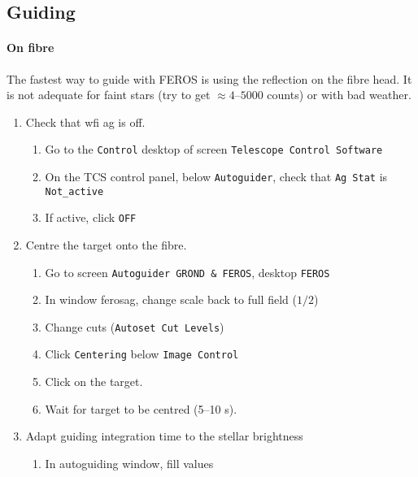 \documentclass[11pt,fleqn,a4paper]{book}
\begin{document}
\newpage

\subsection{Guiding}
\label{sec:ferosguiding}

\paragraph{On fibre}

The fastest way to guide with FEROS is using the reflection on the fibre head.  It is not adequate for faint stars (try to get $\approx 4\text{--}5000$ counts) or with bad weather.

\label{proc:guideferos}
\begin{enumerate}
    \item Check that \gls{wfi} \gls{ag} is off.
    \begin{enumerate}
        \item Go to the \texttt{Control} \gls{desktop} of screen \texttt{Telescope Control Software}
        \item On the \gls{TCS control panel}, below \texttt{Autoguider}, check that \texttt{Ag Stat} is \texttt{Not\_active}
        \item If active, click \texttt{OFF} 
    \end{enumerate}
    \item Centre the target onto the fibre.
    \begin{enumerate}
        \item Go to screen \texttt{Autoguider GROND \& FEROS}, \gls{desktop} \texttt{FEROS}
        \item In window \gls{ferosag}, change scale back to full field ($1/2$) 
        \item Change cuts (\texttt{Autoset Cut Levels})
        \item Click \texttt{Centering} below \texttt{Image Control}
        \item Click on the target.
        \item Wait for target to be centred (5--10 s).
    \end{enumerate}
    \item\label{list:agcontrol}Adapt guiding integration time to the stellar brightness
    \begin{enumerate}
        \item In \gls{autoguiding} window, fill values

\end{enumerate}
\end{enumerate}
\end{document}

